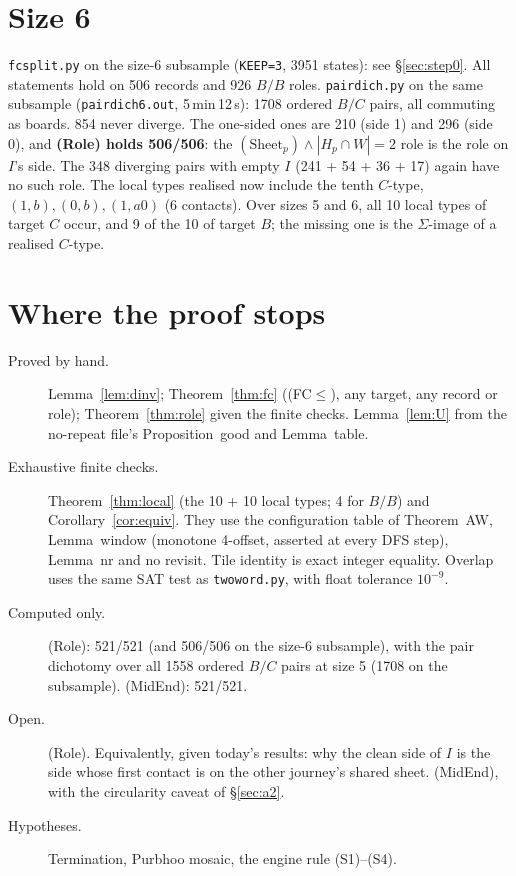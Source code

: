 \documentclass[11pt]{article}
\theoremstyle{definition}\newtheorem{definition}[theorem]{Definition}\newtheorem{remark}[theorem]{Remark}
\begin{document}
\section{Size 6}\label{sec:six}
\texttt{fcsplit.py} on the size-6 subsample (\texttt{KEEP=3}, 3951 states): see \S\ref{sec:step0}. All statements hold on 506 records and 926 $B/B$ roles.
\texttt{pairdich.py} on the same subsample (\texttt{pairdich6.out}, 5\,min\,12\,s): 1708 ordered $B/C$ pairs, all commuting as boards. 854 never diverge. The one-sided ones are 210 (side 1) and 296 (side 0), and \textbf{(Role) holds 506/506}: the $(\mathrm{Sheet}_p)\wedge|H_p\cap W|=2$ role is the role on $I$'s side. The 348 diverging pairs with empty $I$ (241 + 54 + 36 + 17) again have no such role. The local types realised now include the tenth $C$-type, $(1,b),(0,b),(1,a0)$ (6 contacts). Over sizes 5 and 6, all 10 local types of target $C$ occur, and 9 of the 10 of target $B$; the missing one is the $\Sigma$-image of a realised $C$-type.

\section{Where the proof stops}\label{sec:gaps}
\begin{description}
\item[Proved by hand.] Lemma~\ref{lem:dinv}; Theorem~\ref{thm:fc} ((FC$\le$), any target, any record or role); Theorem~\ref{thm:role} given the finite checks. Lemma~\ref{lem:U} from the no-repeat file's Proposition~good and Lemma~table.
\item[Exhaustive finite checks.] Theorem~\ref{thm:local} (the 10 + 10 local types; 4 for $B/B$) and Corollary~\ref{cor:equiv}. They use the configuration table of Theorem~AW, Lemma~window (monotone 4-offset, asserted at every DFS step), Lemma~nr and no revisit. Tile identity is exact integer equality. Overlap uses the same SAT test as \texttt{twoword.py}, with float tolerance $10^{-9}$.
\item[Computed only.] (Role): 521/521 (and 506/506 on the size-6 subsample), with the pair dichotomy over all 1558 ordered $B/C$ pairs at size 5 (1708 on the subsample). (MidEnd): 521/521.
\item[Open.] (Role). Equivalently, given today's results: why the clean side of $I$ is the side whose first contact is on the other journey's shared sheet. (MidEnd), with the circularity caveat of \S\ref{sec:a2}.
\item[Hypotheses.] Termination, Purbhoo mosaic, the engine rule (S1)--(S4).
\end{description}
\end{document}

